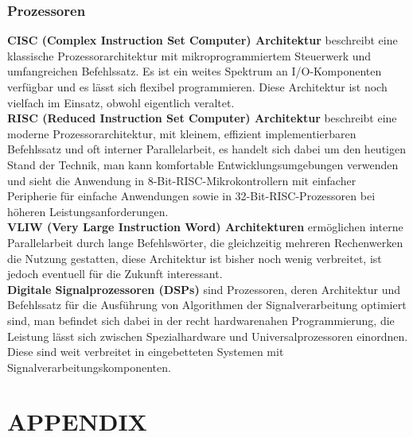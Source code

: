 \documentclass[a4paper, 10 pt, conference]{ieeeconf}
\begin{document}
\subsubsection*{\textbf{Prozessoren}}
\textbf{CISC (Complex Instruction Set Computer) Architektur} beschreibt eine klassische Prozessorarchitektur mit mikroprogrammiertem Steuerwerk und umfangreichen Befehlssatz. Es ist ein weites Spektrum an I/O-Komponenten verfügbar und es lässt sich flexibel programmieren. Diese Architektur ist noch vielfach im Einsatz, obwohl eigentlich veraltet. \\
\textbf{RISC (Reduced Instruction Set Computer) Architektur} beschreibt eine moderne Prozessorarchitektur, mit kleinem, effizient implementierbaren Befehlssatz und oft interner Parallelarbeit, es handelt sich dabei um den heutigen Stand der Technik, man kann komfortable Entwicklungsumgebungen verwenden und sieht die Anwendung in 8-Bit-RISC-Mikrokontrollern mit einfacher Peripherie für einfache Anwendungen sowie in 32-Bit-RISC-Prozessoren bei höheren Leistungsanforderungen. \\
\textbf{VLIW (Very Large Instruction Word) Architekturen} ermöglichen interne Parallelarbeit durch lange Befehlswörter, die gleichzeitig mehreren Rechenwerken die Nutzung gestatten, diese Architektur ist bisher noch wenig verbreitet, ist jedoch eventuell für die Zukunft interessant. \\
\textbf{Digitale Signalprozessoren (DSPs)} sind Prozessoren, deren Architektur und Befehlssatz für die Ausführung von Algorithmen der Signalverarbeitung optimiert sind, man befindet sich dabei in der recht hardwarenahen Programmierung, die Leistung lässt sich zwischen Spezialhardware und Universalprozessoren einordnen. Diese sind weit verbreitet in eingebetteten Systemen mit Signalverarbeitungskomponenten. 


















\section*{APPENDIX}



\printbibliography
\end{document}

